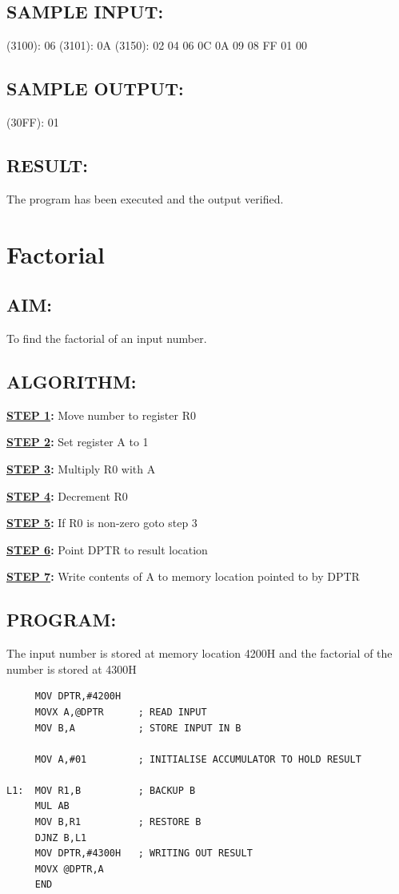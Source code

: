 \documentclass[a4paper,28pt]{report}
\begin{document}
\section*{SAMPLE INPUT:}
(3100): 06\newline
(3101): 0A\newline
(3150): 02 04 06 0C 0A 09 08 FF 01 00
\section*{SAMPLE OUTPUT:}
(30FF): 01
\section*{RESULT:}
The program has been executed and the output verified.
%
%
%
\chapter{Factorial}
\section*{AIM:}

To find the factorial of an input number.

\section*{ALGORITHM:}
\textbf{\underline{STEP 1}:} Move number to register R0

\textbf{\underline{STEP 2}:} Set register A to 1

\textbf{\underline{STEP 3}:} Multiply R0 with A

\textbf{\underline{STEP 4}:} Decrement R0

\textbf{\underline{STEP 5}:} If R0 is non-zero goto step 3

\textbf{\underline{STEP 6}:} Point DPTR to result location

\textbf{\underline{STEP 7}:} Write contents of A to memory location pointed to by DPTR

\section*{PROGRAM:}
The input number is stored at memory location 4200H and the factorial of the number is stored at 4300H
\begin{lstlisting}
     MOV DPTR,#4200H
     MOVX A,@DPTR      ; READ INPUT
     MOV B,A           ; STORE INPUT IN B
     
     MOV A,#01         ; INITIALISE ACCUMULATOR TO HOLD RESULT
     
L1:  MOV R1,B          ; BACKUP B    
     MUL AB            
     MOV B,R1          ; RESTORE B
     DJNZ B,L1
     MOV DPTR,#4300H   ; WRITING OUT RESULT
     MOVX @DPTR,A
     END
\end{lstlisting}
\end{document}
